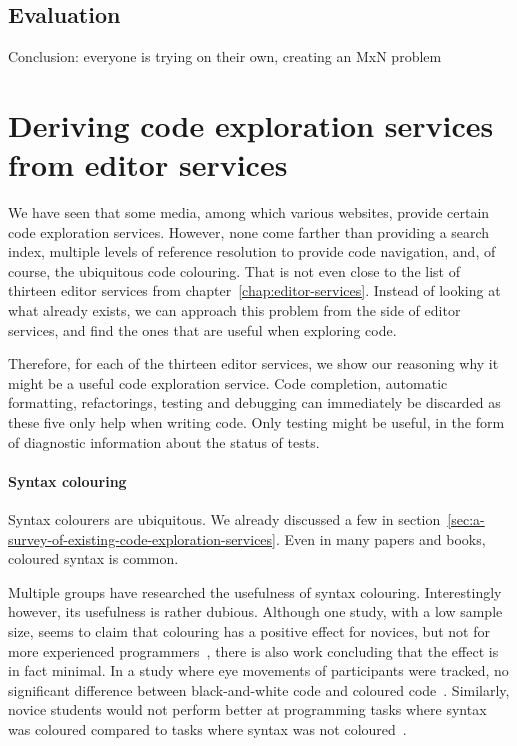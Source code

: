 \subsection{Evaluation}

Conclusion: everyone is trying on their own, creating an MxN problem

\section{Deriving code exploration services from editor services}

We have seen that some media, among which various websites, provide certain code exploration services.
However, none come farther than providing a search index, multiple levels of reference resolution to provide
code navigation, and, of course, the ubiquitous code colouring.
That is not even close to the list of thirteen editor services from chapter~\ref{chap:editor-services}.
Instead of looking at what already exists, we can approach this problem from the side of editor services, and find the
ones that are useful when exploring code.

Therefore, for each of the thirteen editor services, we show our reasoning why it might be a useful code exploration service.
Code completion, automatic formatting, refactorings, testing and debugging can immediately be discarded as these five only help
when writing code.
Only testing might be useful, in the form of diagnostic information about the status of tests.

\paragraph{Syntax colouring}

Syntax colourers are ubiquitous.
We already discussed a few in section~\ref{sec:a-survey-of-existing-code-exploration-services}.
Even in many papers and books, coloured syntax is common.

Multiple groups have researched the usefulness of syntax colouring.
Interestingly however, its usefulness is rather dubious.
Although one study, with a low sample size, seems to claim that colouring has a positive effect for novices, but not for
more experienced programmers~\autocite{Sarkar15a-0}, there is also work concluding that the effect is in fact minimal.
In a study where eye movements of participants were tracked, no significant difference between black-and-white code and coloured code~\autocite{beelders2016syntax}.
Similarly, novice students would not perform better at programming tasks where syntax was coloured compared to tasks where syntax was not coloured~\autocite{HannebauerHG18}.

